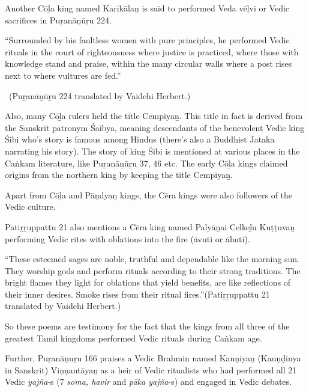Another Cōḻa king named Karikālaṉ is said to performed Veda vēḷvi or Vedic sacrifices in Puṟanāṉūṟu 224.

\begin{myquote}
“Surrounded by his faultless women with pure principles, he performed Vedic rituals in the court of righteousness where justice is practiced, where those with knowledge stand and praise, within the many circular walls where a post rises next to where vultures are fed.”

~\hfill (Puṟanāṉūṟu 224 translated by Vaidehi Herbert.)
\end{myquote}

Also, many Cōḻa rulers held the title Cempiyaṉ. This title in fact is derived from the Sanskrit patronym Śaibya, meaning descendants of the benevolent Vedic king Śibi who's story is famous among Hindus (there's also a Buddhist Jataka narrating his story). The story of king Śibi is mentioned at various places in the Caṅkam literature, like Puṟanāṉūṟu 37, 46 etc. The early Cōḻa kings claimed origins from the northern king by keeping the title Cempiyaṉ.

Apart from Cōḻa and Pāṇdyaṉ kings, the Cēra kings were also followers of the Vedic culture.

Patiṟṟuppattu 21 also mentions a Cēra king named Palyāṉai Celkeḻu Kuṭṭuvaṉ performing Vedic rites with oblations into the fire (āvuti or āhuti).

\begin{myquote}
“These esteemed sages are noble, truthful and dependable like the morning sun. They worship gods and perform rituals according to their strong traditions. The bright flames they light for oblations that yield benefits, are like reflections of their inner desires. Smoke rises from their ritual fires.”\hfill (Patiṟṟuppattu 21 translated by Vaidehi Herbert.)
\end{myquote}

So these poems are testimony for the fact that the kings from all three of the greatest Tamil kingdoms performed Vedic rituals during Caṅkam age.

Further, Puṟanāṉuṟu 166 praises a Vedic Brahmin named Kauṇiyaṉ (Kauṇḍinya in Sanskrit) Viṇṇantāyaṉ as a heir of Vedic ritualists who had performed all 21 Vedic \textit{yajña}-s (7 \textit{soma, havir} and \textit{pāka yajña}-s) and engaged in Vedic debates.

